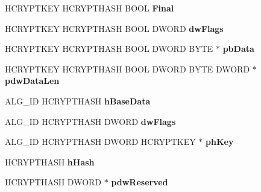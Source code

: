 \begin{DoxyCompactItemize}
\item 
\mbox{\label{structtag_p_r_o_v_f_u_n_c_s_af87fa75ac85922a8391bc0833c4ec371}} 
H\+C\+R\+Y\+P\+T\+K\+EY H\+C\+R\+Y\+P\+T\+H\+A\+SH B\+O\+OL {\bfseries Final}
\item 
\mbox{\label{structtag_p_r_o_v_f_u_n_c_s_adebac8103e4303495bb23953f9ec3e6d}} 
H\+C\+R\+Y\+P\+T\+K\+EY H\+C\+R\+Y\+P\+T\+H\+A\+SH B\+O\+OL D\+W\+O\+RD {\bfseries dw\+Flags}
\item 
\mbox{\label{structtag_p_r_o_v_f_u_n_c_s_a642ff6a20825dbc8d7d6294f05163eb4}} 
H\+C\+R\+Y\+P\+T\+K\+EY H\+C\+R\+Y\+P\+T\+H\+A\+SH B\+O\+OL D\+W\+O\+RD B\+Y\+TE $\ast$ {\bfseries pb\+Data}
\item 
\mbox{\label{structtag_p_r_o_v_f_u_n_c_s_a96b15890e6b3b2a4644054e6169601d0}} 
H\+C\+R\+Y\+P\+T\+K\+EY H\+C\+R\+Y\+P\+T\+H\+A\+SH B\+O\+OL D\+W\+O\+RD B\+Y\+TE D\+W\+O\+RD $\ast$ {\bfseries pdw\+Data\+Len}
\item 
\mbox{\label{structtag_p_r_o_v_f_u_n_c_s_ad06b7dedf818080e9c29a452fb229498}} 
A\+L\+G\+\_\+\+ID H\+C\+R\+Y\+P\+T\+H\+A\+SH {\bfseries h\+Base\+Data}
\item 
\mbox{\label{structtag_p_r_o_v_f_u_n_c_s_a9bd2170f889909763c73773330131e06}} 
A\+L\+G\+\_\+\+ID H\+C\+R\+Y\+P\+T\+H\+A\+SH D\+W\+O\+RD {\bfseries dw\+Flags}
\item 
\mbox{\label{structtag_p_r_o_v_f_u_n_c_s_a0432319223692ebb615a7c977a869701}} 
A\+L\+G\+\_\+\+ID H\+C\+R\+Y\+P\+T\+H\+A\+SH D\+W\+O\+RD H\+C\+R\+Y\+P\+T\+K\+EY $\ast$ {\bfseries ph\+Key}
\item 
\mbox{\label{structtag_p_r_o_v_f_u_n_c_s_a2c67c268ec95ccf367c2715aaa8805f6}} 
H\+C\+R\+Y\+P\+T\+H\+A\+SH {\bfseries h\+Hash}
\item 
\mbox{\label{structtag_p_r_o_v_f_u_n_c_s_a2d85dc0f6b33cda896f9712e45f76ae6}} 
H\+C\+R\+Y\+P\+T\+H\+A\+SH D\+W\+O\+RD $\ast$ {\bfseries pdw\+Reserved}
\item 

\end{DoxyCompactItemize}
